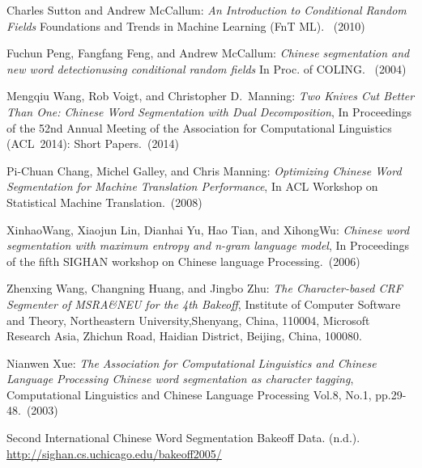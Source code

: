 \documentclass[UTF8,11pt]{article}
\begin{document}
\begin{thebibliography}{99}

 Charles Sutton and Andrew McCallum:
\emph{An Introduction to Conditional Random Fields}
Foundations and Trends in Machine Learning (FnT ML). ~(2010)

Fuchun Peng, Fangfang Feng, and Andrew McCallum:
\emph{Chinese segmentation and new word detectionusing conditional random fields} 
In Proc. of COLING. ~(2004)

 Mengqiu Wang, Rob Voigt, and Christopher D.~Manning:
\emph{Two Knives Cut Better Than One: Chinese Word Segmentation with Dual Decomposition},
In Proceedings of the 52nd Annual Meeting of the Association for Computational Linguistics (ACL~2014): Short Papers.~(2014)

 Pi-Chuan Chang, Michel Galley, and Chris Manning:
\emph{Optimizing Chinese Word Segmentation for Machine Translation Performance},
In ACL Workshop on Statistical Machine Translation.~(2008)

 XinhaoWang, Xiaojun Lin, Dianhai Yu, Hao Tian, and XihongWu:
\emph{Chinese word segmentation with maximum entropy and n-gram language model},
In Proceedings of the fifth SIGHAN workshop on Chinese language Processing.~(2006)

 Zhenxing Wang, Changning Huang, and Jingbo Zhu:
\emph{The Character-based CRF Segmenter of MSRA\&NEU for the 4th Bakeoff},
Institute of Computer Software and Theory, Northeastern University,Shenyang, China, 110004, Microsoft Research Asia, Zhichun Road, Haidian District, Beijing, China, 100080.

 Nianwen Xue:
\emph{The Association for Computational Linguistics and Chinese Language Processing Chinese word segmentation as character tagging},
Computational Linguistics and Chinese Language Processing Vol.8, No.1, pp.29-48.~(2003)

 Second International Chinese Word Segmentation Bakeoff Data. (n.d.). \\
\url{http://sighan.cs.uchicago.edu/bakeoff2005/}


\end{thebibliography}
\end{document}
